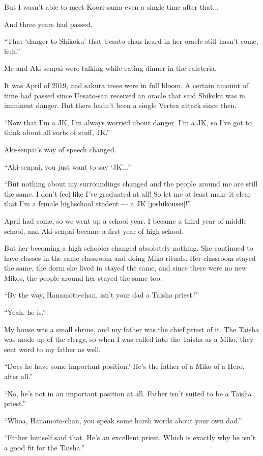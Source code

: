 But I wasn't able to meet Koori-sama even a single time after that...

And three years had passed.

``That `danger to Shikoku' that Uesato-chan heard in her oracle still hasn't come, huh.''

Me and Aki-senpai were talking while eating dinner in the cafeteria.

It was April of 2019, and sakura trees were in full bloom. A certain amount of time had passed since Uesato-san received an oracle that said Shikoku was in imminent danger. But there hadn't been a single Vertex attack since then.

``Now that I'm a JK, I'm always worried about danger. I'm a JK, so I've got to think about all sorts of stuff, JK.''

Aki-senpai's way of speech changed.

``Aki-senpai, you just want to say `JK'...''

``But nothing about my surroundings changed and the people around me are still the same. I don't feel like I've graduated at all! So let me at least make it clear that I'm a female highschool student --- a JK [joshikousei]!''

April had come, so we went up a school year. I became a third year of middle school, and Aki-senpai became a first year of high school.

But her becoming a high schooler changed absolutely nothing. She continued to have classes in the same classroom and doing Miko rituals. Her classroom stayed the same, the dorm she lived in stayed the same, and since there were no new Mikos, the people around her stayed the same too.

``By the way, Hanamoto-chan, isn't your dad a Taisha priest?''

``Yeah, he is.''

My house was a small shrine, and my father was the chief priest of it. The Taisha was made up of the clergy, so when I was called into the Taisha as a Miko, they sent word to my father as well.

``Does he have some important position? He's the father of a Miko of a Hero, after all.''

``No, he's not in an important position at all. Father isn't suited to be a Taisha priest.''

``Whoa, Hanamoto-chan, you speak some harsh words about your own dad.''

``Father himself said that. He's an excellent priest. Which is exactly why he isn't a good fit for the Taisha.''

